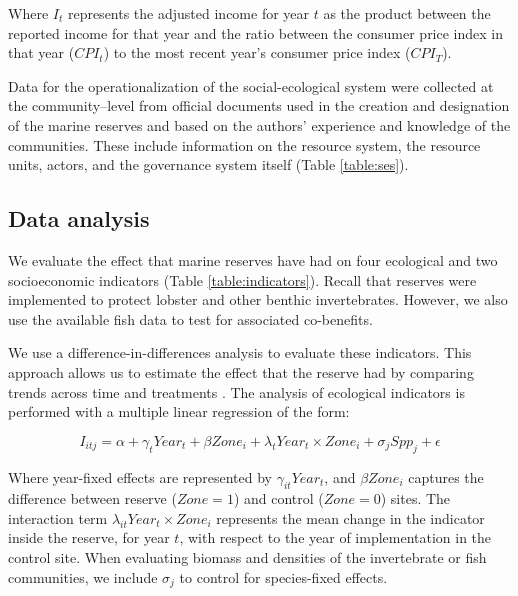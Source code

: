 \documentclass{frontiersSCNS}
\theoremstyle{definition}
\theoremstyle{definition}
\theoremstyle{definition}
\theoremstyle{remark}
\begin{document}
Where \(I_t\) represents the adjusted income for year \(t\) as the
product between the reported income for that year and the ratio between
the consumer price index in that year (\(CPI_t\)) to the most recent
year's consumer price index (\(CPI_T\)).

Data for the operationalization of the social-ecological system were
collected at the community--level from official documents used in the
creation and designation of the marine reserves
\citep{dof_website_2012,dof_website_2013,dof_website_2018} and based on
the authors' experience and knowledge of the communities. These include
information on the resource system, the resource units, actors, and the
governance system itself (Table \ref{table:ses}).

\subsection{Data analysis}\label{data-analysis}

We evaluate the effect that marine reserves have had on four ecological
and two socioeconomic indicators (Table \ref{table:indicators}). Recall
that reserves were implemented to protect lobster and other benthic
invertebrates. However, we also use the available fish data to test for
associated co-benefits.

We use a difference-in-differences analysis to evaluate these
indicators. This approach allows us to estimate the effect that the
reserve had by comparing trends across time and treatments
\citep{moland_2013-VP,Villasenor-Derbez_2018}. The analysis of
ecological indicators is performed with a multiple linear regression of
the form:

\begin{equation}
I_{itj} = \alpha + \gamma_{t} Year_t + \beta Zone_i + \lambda_{t} Year_t\times Zone_i + \sigma_jSpp_j + \epsilon
\label{eqn:reg_bio}
\end{equation}

Where year-fixed effects are represented by \(\gamma_{it} Year_t\), and
\(\beta Zone_i\) captures the difference between reserve (\(Zone = 1\))
and control (\(Zone = 0\)) sites. The interaction term
\(\lambda_{it} Year_t\times Zone_i\) represents the mean change in the
indicator inside the reserve, for year \(t\), with respect to the year
of implementation in the control site. When evaluating biomass and
densities of the invertebrate or fish communities, we include
\(\sigma_j\) to control for species-fixed effects.
\end{document}
